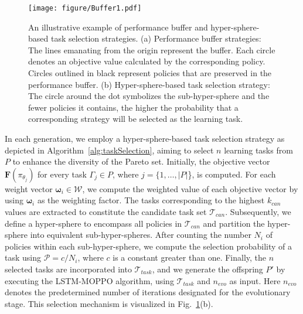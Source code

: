\documentclass[10pt,journal,compsoc]{IEEEtran}
\begin{document}
\begin{figure}[t]
	\centerline{\texttt{[image: figure/Buffer1.pdf]}}
	\caption{An illustrative example of performance buffer and hyper-sphere-based task selection strategies. (a) Performance buffer strategies: The lines emanating from the origin represent the buffer. Each circle denotes an objective value calculated by the corresponding policy. Circles outlined in black represent policies that are preserved in the performance buffer. (b) Hyper-sphere-based task selection strategy: The circle around the dot symbolizes the sub-hyper-sphere and the fewer policies it contains, the higher the probability that a corresponding strategy will be selected as the learning task.}
	\label{fig:buffer}
\end{figure}



\par In each generation, we employ a hyper-sphere-based task selection strategy as depicted in Algorithm~\ref{alg:taskSelection}, aiming to select $n$ learning tasks from $P$ to enhance the diversity of the Pareto set. Initially, the objective vector $\boldsymbol{F}(\pi_{\theta_j})$ for every task $\Gamma_j \in P$, where $j = \{1, \dots, |P|$\}, is computed. For each weight vector $\boldsymbol{\omega}_i \in \mathcal{W}$, we compute the weighted value of each objective vector by using $\boldsymbol{\omega}_i$ as the weighting factor. The tasks corresponding to the highest $k_{can}$ values are extracted to constitute the candidate task set $\mathcal{T}_{can}$. Subsequently, we define a hyper-sphere to encompass all policies in $\mathcal{T}_{can}$ and partition the hyper-sphere into equivalent sub-hyper-spheres. After counting the number $N_i$ of policies within each sub-hyper-sphere, we compute the selection probability of a task using $\mathcal{P} = c / N_i$, where $c$ is a constant greater than one. Finally, the $n$ selected tasks are incorporated into $\mathcal{T}_{task}$, and we generate the offspring $P'$ by executing the LSTM-MOPPO algorithm, using $\mathcal{T}_{task}$ and $n_{evo}$ as input. Here $n_{evo}$ denotes the predetermined number of iterations designated for the evolutionary stage. This selection mechanism is visualized in Fig.~\ref{fig:buffer}(b).
\end{document}
